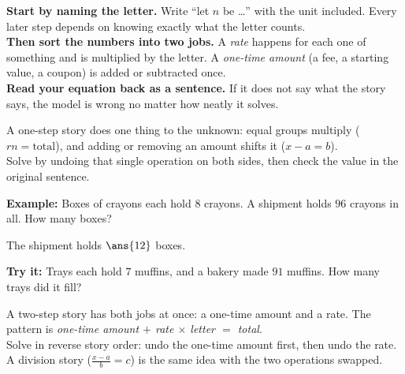 \documentclass[12pt]{article}
\begin{document}

\begin{formulabox}
\textbf{Start by naming the letter.} Write ``let $n$ be \dots'' with the unit
included. Every later step depends on knowing exactly what the letter counts.\\[3pt]
\textbf{Then sort the numbers into two jobs.} A \emph{rate} happens for each
one of something and is multiplied by the letter. A \emph{one-time amount} (a
fee, a starting value, a coupon) is added or subtracted once.\\[3pt]
\textbf{Read your equation back as a sentence.} If it does not say what the
story says, the model is wrong no matter how neatly it solves.
\end{formulabox}


\begin{formulabox}
A one-step story does one thing to the unknown: equal groups multiply
($rn = \text{total}$), and adding or removing an amount shifts it
($x - a = b$).\\[3pt]
Solve by undoing that single operation on both sides, then check the value in
the original sentence.
\end{formulabox}

\begin{examplebox}
\textbf{Example:} Boxes of crayons each hold $8$ crayons. A shipment holds $96$
crayons in all. How many boxes?

The shipment holds $\ans{12}$ boxes.
\end{examplebox}

\begin{tryitbox}
\textbf{Try it:} Trays each hold $7$ muffins, and a bakery made $91$ muffins.
How many trays did it fill?\\[2pt]
\end{tryitbox}


\begin{formulabox}
A two-step story has both jobs at once: a one-time amount and a rate. The
pattern is \emph{one-time amount $+$ rate $\times$ letter $=$ total}.\\[3pt]
Solve in reverse story order: undo the one-time amount first, then undo the
rate. A division story ($\frac{x-a}{b} = c$) is the same idea with the two
operations swapped.
\end{formulabox}
\end{document}
